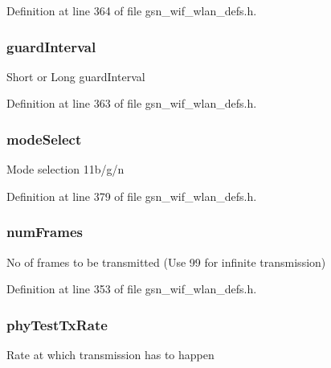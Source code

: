 Definition at line 364 of file gsn\_\-wif\_\-wlan\_\-defs.h.

\hypertarget{a00190_ab98fc9858671817369884eb76059060c}{
\subsubsection[{guardInterval}]{ {\bf guardInterval}}}
\label{a00190_ab98fc9858671817369884eb76059060c}
Short or Long guardInterval 

Definition at line 363 of file gsn\_\-wif\_\-wlan\_\-defs.h.

\hypertarget{a00190_a28cb0da8ec076a6515b226010038aa46}{
\subsubsection[{modeSelect}]{ {\bf modeSelect}}}
\label{a00190_a28cb0da8ec076a6515b226010038aa46}
Mode selection 11b/g/n 

Definition at line 379 of file gsn\_\-wif\_\-wlan\_\-defs.h.

\hypertarget{a00190_a4e13c180765684684613fee7c7d86666}{
\subsubsection[{numFrames}]{ {\bf numFrames}}}
\label{a00190_a4e13c180765684684613fee7c7d86666}
No of frames to be transmitted (Use 99 for infinite transmission) 

Definition at line 353 of file gsn\_\-wif\_\-wlan\_\-defs.h.

\hypertarget{a00190_a7251d0e1cb1d341e0ce219c75c5ce68b}{
\subsubsection[{phyTestTxRate}]{ {\bf phyTestTxRate}}}
\label{a00190_a7251d0e1cb1d341e0ce219c75c5ce68b}
Rate at which transmission has to happen 

